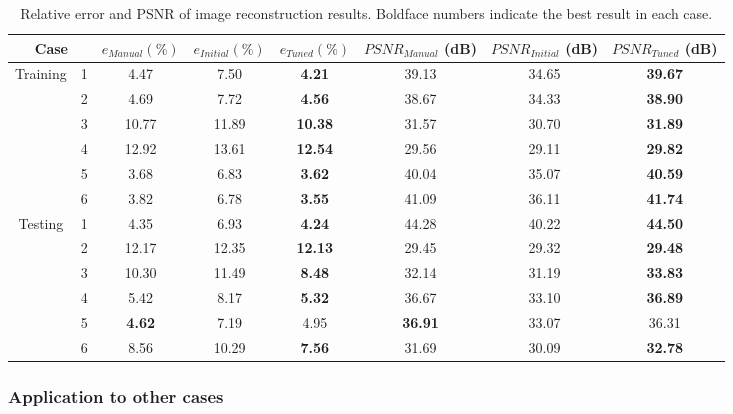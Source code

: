 \documentclass[journal]{IEEEtran}
\begin{document}
\begin{table*}
\centering
\caption{Relative error and PSNR of image reconstruction results. Boldface numbers indicate the best result in each case. }
\label{Table:metrics}
\begin{tabular}{c|c||c|c|c||c|c|c}
            \hline
            \multicolumn{2}{c||}{Case} & $e_{Manual} (\%)$ & $e_{Initial} (\%)$ & $e_{Tuned} (\%)$ & $PSNR_{Manual}$ (dB) & $PSNR_{Initial}$ (dB)& $PSNR_{Tuned}$ (dB)\\ [0.5ex]
            \hline\hline
             \multirow{6}{*}{Training} & 1 & 4.47 & 7.50 & {\bf 4.21} & 39.13 & 34.65 & {\bf 39.67}\\
              & 2 & 4.69 & 7.72 & {\bf 4.56}& 38.67 & 34.33 & {\bf 38.90}\\
              & 3 & 10.77 & 11.89 & {\bf 10.38}& 31.57 & 30.70 & {\bf 31.89}\\
              & 4 & 12.92 & 13.61 & {\bf 12.54}& 29.56 & 29.11 & {\bf 29.82}\\
              & 5 & 3.68 & 6.83 & {\bf 3.62}& 40.04 & 35.07 & {\bf 40.59}\\
              & 6 & 3.82 & 6.78 & {\bf 3.55}& 41.09 & 36.11 & {\bf 41.74}\\
            \hline
            \multirow{6}{*}{Testing} & 1 & 4.35 & 6.93 & {\bf 4.24}& 44.28 & 40.22 & {\bf 44.50} \\
              & 2 & 12.17 & 12.35 & {\bf 12.13}& 29.45 & 29.32 & {\bf 29.48}\\
              & 3 & 10.30 & 11.49 & {\bf 8.48}& 32.14 & 31.19 & {\bf 33.83}\\
              & 4 & 5.42 & 8.17 & {\bf 5.32}& 36.67 & 33.10 & {\bf 36.89}\\
              & 5 & {\bf 4.62} & 7.19 & 4.95& {\bf 36.91} & 33.07 &  36.31\\
              & 6 & 8.56 & 10.29 & {\bf 7.56}& 31.69 & 30.09 & {\bf 32.78}\\
            \hline
        \end{tabular}
\end{table*}


\subsubsection{Application to other cases}
\end{document}
